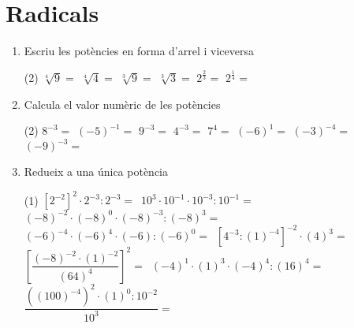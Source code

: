 \documentclass[a4paper]{article},
\begin{document}
  \section{Radicals}
      \begin{enumerate}[resume]
    \item Escriu les potències en forma d'arrel i viceversa
    \begin{tasks}(2)
      \task $ \sqrt[4]{9}={}$
      \task $ \sqrt[4]{4}={}$
      \task $ \sqrt[3]{9}={}$
      \task $ \sqrt[3]{3}={}$
      \task $2^{\frac{2}{3}}={}$
      \task $2^{\frac{1}{4}}={}$
    \end{tasks}
    \item Calcula el valor numèric de les potències
    \begin{tasks}(2)
      \task $8^{-3}={}$
      \task $\left( -5\right)^{-1}={}$
      \task $9^{-3}={}$
      \task $4^{-3}={}$
      \task $7^{4}={}$
      \task $\left( -6\right)^{1}={}$
      \task $\left( -3\right)^{-4}={}$
      \task $\left( -9\right)^{-3}={}$
    \end{tasks}
    \item Redueix a una única potència
    \begin{tasks}(1)
      \task $\left[2^{-2} \right]^{2} \cdot 2^{-3} : 2^{-3}={\,}$
      \task $10^{3} \cdot 10^{-1}\cdot 10^{-3} : 10^{-1}={\,}$
      \task $\left(-8\right)^{-2} \cdot \left(-8\right)^{0}\cdot \left(-8\right)^{-3} : \left(-8\right)^{3}={\,}$
      \task $\left(-6\right)^{-4} \cdot \left(-6\right)^{4}\cdot \left(-6\right) : \left(-6\right)^{0}={\,}$
      \task $\left[4^{-3} : \left( 1 \right)^{-4} \right]^{-2} \cdot \left( 4 \right)^{3} ={\,}$
      \task $\left[ \dfrac{\left(-8\right)^{-2}\cdot \left( 1 \right)^{-2}}{\left( 64 \right)^{4}} \right]^{2}={\,}$
      \task $\left(-4\right)^{1} \cdot \left( 1 \right)^{3} \cdot \left(-4\right)^{4} : \left( 16 \right)^{4}={\,}$
      \task $\dfrac{ \left(\left( 100 \right)^{-4}\right)^{2} \cdot \left( 1 \right)^{0} : 10^{-2 }}{10^{3}}={\,}$
    \end{tasks}
\par \noindent \vspace{0.25cm} 
\vspace{0.25cm}



\end{enumerate}
\end{document}
